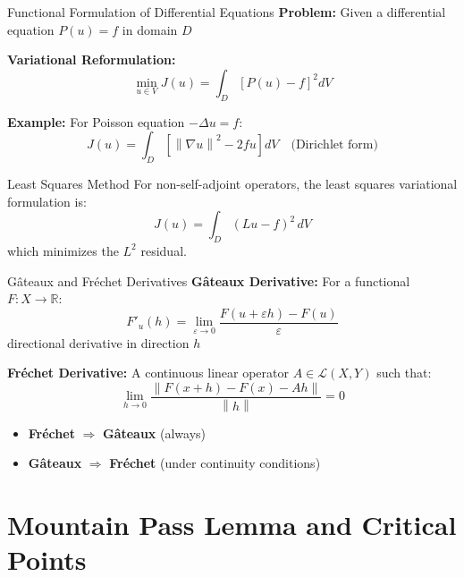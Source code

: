 \documentclass[aspectratio=169,10pt]{beamer}
\newcommand{\norm}[1]{\left\lVert #1 \right\rVert}
\begin{document}
\begin{frame}{Functional Formulation of Differential Equations}
  \textbf{Problem:} Given a differential equation $P(u) = f$ in domain $D$

  \textbf{Variational Reformulation:}
  \[
    \min_{u \in V} J(u) = \int_D \left[P(u) - f\right]^2 dV
  \]

  \vspace{0.2cm}
  \textbf{Example:} For Poisson equation $-\Delta u = f$:
  \[
    J(u) = \int_D \left[\norm{\nabla u}^2 - 2fu\right] dV \quad \text{(Dirichlet form)}
  \]

  \vspace{0.3cm}
  \begin{block}{Least Squares Method}
    For non-self-adjoint operators, the least squares variational formulation is:
    \[
      J(u) = \int_D (Lu - f)^2 \, dV
    \]
    which minimizes the $L^2$ residual.
  \end{block}
\end{frame}

\begin{frame}{Gâteaux and Fréchet Derivatives}
  \textbf{Gâteaux Derivative:} For a functional $F: X \to \mathbb{R}$:
  \[
    F'_u(h) = \lim_{\varepsilon \to 0} \frac{F(u + \varepsilon h) - F(u)}{\varepsilon}
  \]
  directional derivative in direction $h$

  \vspace{0.3cm}
  \textbf{Fréchet Derivative:} A continuous linear operator $A \in \mathcal{L}(X, Y)$ such that:
  \[
    \lim_{h \to 0} \frac{\norm{F(x + h) - F(x) - Ah}}{\norm{h}} = 0
  \]

  \vspace{0.3cm}
  \begin{itemize}
    \item \textbf{Fréchet} $\Rightarrow$ \textbf{Gâteaux} (always)
    \item \textbf{Gâteaux} $\Rightarrow$ \textbf{Fréchet} (under continuity conditions)
  \end{itemize}
\end{frame}

\section{Mountain Pass Lemma and Critical Points}
\end{document}
